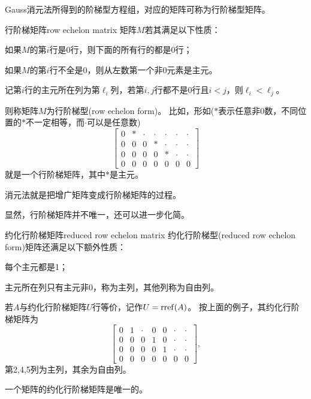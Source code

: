 Gauss消元法所得到的阶梯型方程组，对应的矩阵可称为行阶梯型矩阵。

\begin{definition}{行阶梯矩阵}{row echelon matrix}
	矩阵$M$若其满足以下性质：
	\begin{compactitem}
		\item 如果$M$的第$i$行是0行，则下面的所有行的都是0行；
		\item 如果$M$的第$i$行不全是0，则从左数第一个非0元素是主元。
		\item 记第$i$行的主元所在列为第$\ell_i$列，若第$i,j$行都不是0行且$i<j$，则$\ell_i<\ell_j$。
	\end{compactitem}
	则称矩阵$M$为行阶梯型(row echelon form)。
	\tcblower
	比如，形如($\ast$表示任意非0数，不同位置的$\ast$不一定相等，而$\cdot$可以是任意数)
	\[
		\begin{bmatrix}
			0&\ast&\cdot&\cdot&\cdot&\cdot&\cdot\\
			0&0&0&\ast&\cdot&\cdot&\cdot\\
			0&0&0&0&\ast&\cdot&\cdot\\
			0&0&0&0&0&0&0
		\end{bmatrix}
	\]
	就是一个行阶梯矩阵，其中$\ast$是主元。
\end{definition}
\begin{remark}
	消元法就是把增广矩阵变成行阶梯矩阵的过程。
\end{remark}

显然，行阶梯矩阵并不唯一，还可以进一步化简。

\begin{definition}{约化行阶梯矩阵}{reduced row echelon matrix}
	约化行阶梯型(reduced row echelon form)矩阵还满足以下额外性质：
	\begin{compactitem}
		\item 每个主元都是1；
		\item 主元所在列只有主元非0，称为主列，其他列称为自由列。
	\end{compactitem}
	若$A$与约化行阶梯矩阵$U$行等价，记作$U=\operatorname{rref}(A)$。
	\tcblower
	按上面的例子，其约化行阶梯矩阵为
	\[
		\begin{bmatrix}
			0&1&\cdot&0&0&\cdot&\cdot\\
			0&0&0&1&0&\cdot&\cdot\\
			0&0&0&0&1&\cdot&\cdot\\
			0&0&0&0&0&0&0
		\end{bmatrix},
	\]
	第2,4,5列为主列，其余为自由列。
\end{definition}
\begin{theorem}
	{}{}
	一个矩阵的约化行阶梯矩阵是唯一的。
\end{theorem}

